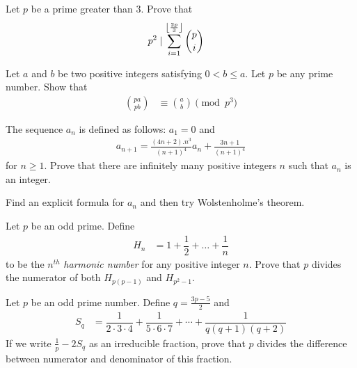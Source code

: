 \begin{problem}[Putnam 1996] %
	Let $p$ be a prime greater than $3$. Prove that
	\begin{align*}
		p^2
			& \mid \sum_{i=1}^{\left\lfloor{\frac{2p}{3}}\right\rfloor}\binom{p}{i}
	\end{align*}
\end{problem}

\begin{problem} %
	Let $a$ and $b$ be two positive integers satisfying $0<b\leq a.$ Let $p$ be any prime number. Show that
	\begin{align*}
		\binom{pa}{pb}
			& \equiv \binom{a}{b} \pmod{p^3}
	\end{align*}
\end{problem}

\begin{problem} %
	The sequence $a_n$ is defined as follows: $a_1 = 0$ and
	\begin{align*}
		a_{n+1}=\frac{\ensuremath{(4n+2).n^{3}}}{(n+1)^{4}}a_{n}+\frac{3n+1}{(n+1)^{4}}
	\end{align*}
	for $n\ge1 $. Prove that there are infinitely many positive integers $n$ such that $a_n$ is an integer.
\end{problem}

\begin{hint}
	Find an explicit formula for $a_n$ and then try Wolstenholme's theorem.
\end{hint}

\begin{problem} %
	Let $p$ be an odd prime. Define
	\begin{align*}
		H_n
			& = 1 + \dfrac{1}{2}+\ldots+\dfrac{1}{n}
	\end{align*}
	to be the $n^{th}$ \textit{harmonic number} for any positive integer $n$. Prove that $p$ divides the numerator of both $H_{p(p-1)}$ and $H_{p^2-1}$.
\end{problem}

\begin{problem} %
	Let $p$ be an odd prime number. Define $q = \frac{3p-5}{2}$ and
	\begin{align*}
		S_q
			& = \dfrac{1}{2 \cdot 3 \cdot 4} + \dfrac {1}{5 \cdot 6 \cdot 7} + \cdots + \dfrac{1}{q(q+1)(q+2)}
	\end{align*}
	If we write $\frac{1}{p} - 2S_q $ as an irreducible fraction, prove that $p$ divides the difference between numerator and denominator of this fraction.
\end{problem}

